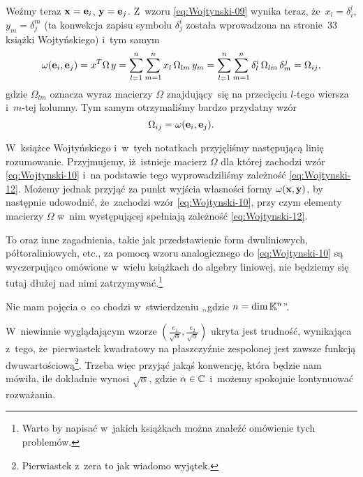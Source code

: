 \documentclass[a4paper,11pt]{article}
\begin{document}
Weźmy teraz $\mathbf{x} = \mathbf{e}_{ i }$, $\mathbf{y} = \mathbf{e}_{ j }$.
Z~wzoru \eqref{eq:Wojtynski-09} wynika teraz, że~$x_{ l } = \delta^{ l }_{ i }$,
$y_{ m } = \delta^{ m }_{ j }$ (ta konwekcja zapisu symbolu $\delta^{ i }_{ j }$ została
wprowadzona na stronie~33 książki Wojtyńskiego) i~tym samym
\begin{equation}
  \label{eq:Wojtynski-11}
  \omega( \mathbf{e}_{ i }, \mathbf{e}_{ j } ) = x^{ T } \Omega \, y =
  \sum_{ l = 1 }^{ n } \sum_{ m = 1 }^{ n } x_{ l } \, \Omega_{ l m } \, y_{ m } =
  \sum_{ l = 1 }^{ n } \sum_{ m = 1 }^{ n } \delta^{ i }_{ l } \, \Omega_{ l m } \, \delta^{ j }_{ m } =
  \Omega_{ i j },
\end{equation}
gdzie $\Omega_{ l m }$ oznacza wyraz macierzy $\Omega$ znajdujący~się na przecięciu
$l$-tego wiersza i~$m$-tej kolumny. Tym samym otrzymaliśmy bardzo przydatny
wzór
\begin{equation}
  \label{eq:Wojtynski-12}
  \Omega_{ i j } = \omega( \mathbf{e}_{ i }, \mathbf{e}_{ j } ).
\end{equation}

W~książce Wojtyńskiego i~w~tych notatkach przyjęliśmy następującą linię
rozumowanie. Przyjmujemy, iż~istnieje macierz $\Omega$ dla której zachodzi wzór
\eqref{eq:Wojtynski-10} i~na podstawie tego wyprowadziliśmy zależność
\eqref{eq:Wojtynski-12}. Możemy jednak przyjąć za punkt wyjścia własności
formy $\omega( \mathbf{x}, \mathbf{y} )$, by następnie udowodnić, że~zachodzi wzór
\eqref{eq:Wojtynski-10}, przy czym elementy macierzy $\Omega$ w~nim występującej
spełniają zależność \eqref{eq:Wojtynski-12}.

To oraz inne zagadnienia, takie jak przedstawienie form dwuliniowych,
półtoraliniowych, etc., za pomocą wzoru analogicznego do
\eqref{eq:Wojtynski-10} są wyczerpująco omówione w~wielu książkach do
algebry liniowej, nie będziemy się tutaj dłużej nad nimi
zatrzymywać.\footnote{Warto by napisać w~jakich książkach można znaleźć
  omówienie tych problemów.}

\vspace{\spaceFour}




 Nie mam pojęcia o~co chodzi w~stwierdzeniu
„gdzie $n = \dim \mathbb{K}^{ n }$”.

\vspace{\spaceFour}





 W~niewinnie wyglądającym wzorze $\left(
  \frac{ e_{ 1 } }{ \sqrt{ \alpha } }, \frac{ e_{ 2 } }{ \sqrt{ \alpha } } \right)$
ukryta jest trudność, wynikająca z~tego, że~pierwiastek kwadratowy na
płaszczyźnie zespolonej jest zawsze funkcją
dwuwartościową\footnote{Pierwiastek z~zera to jak wiadomo wyjątek.}.
Trzeba więc przyjąć jakąś konwencję, która będzie nam mówiła, ile dokładnie
wynosi $\sqrt{ \alpha }$, gdzie $\alpha \in \mathbb{C}$ i~możemy spokojnie kontynuować
rozważania.
\end{document}
